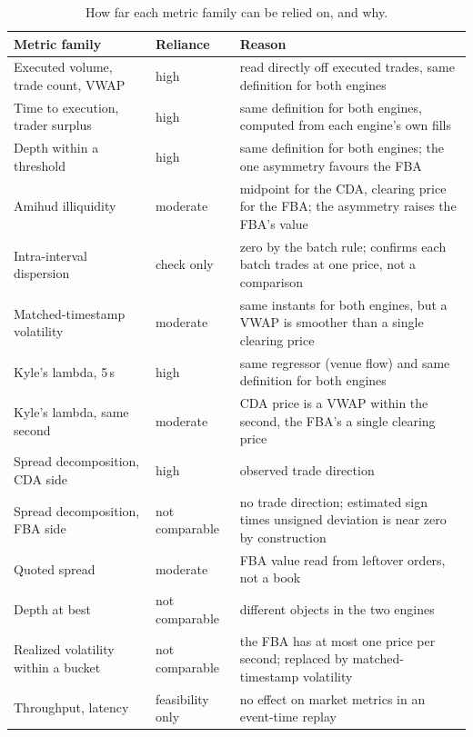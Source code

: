 \begin{table}[htbp]
\centering
\caption[How far each metric can be relied on]{How far each metric family
can be relied on, and why.}
\label{tab:confidence}
\small
\begin{tabularx}{\textwidth}{@{}p{4.2cm} p{2.4cm} L@{}}
\toprule
\textbf{Metric family} & \textbf{Reliance} & \textbf{Reason}\\
\midrule
Executed volume, trade count, VWAP & high & read directly off executed trades, same definition for both engines\\
Time to execution, trader surplus & high & same definition for both engines, computed from each engine's own fills\\
Depth within a threshold & high & same definition for both engines; the one asymmetry favours the FBA\\
Amihud illiquidity & moderate & midpoint for the CDA, clearing price for the FBA; the asymmetry raises the FBA's value\\
Intra-interval dispersion & check only & zero by the batch rule; confirms each batch trades at one price, not a comparison\\
Matched-timestamp volatility & moderate & same instants for both engines, but a VWAP is smoother than a single clearing price\\
Kyle's lambda, 5\,s & high & same regressor (venue flow) and same definition for both engines\\
Kyle's lambda, same second & moderate & CDA price is a VWAP within the second, the FBA's a single clearing price\\
Spread decomposition, CDA side & high & observed trade direction\\
Spread decomposition, FBA side & not comparable & no trade direction; estimated sign times unsigned deviation is near zero by construction\\
Quoted spread & moderate & FBA value read from leftover orders, not a book\\
Depth at best & not comparable & different objects in the two engines\\
Realized volatility within a bucket & not comparable & the FBA has at most one price per second; replaced by matched-timestamp volatility\\
Throughput, latency & feasibility only & no effect on market metrics in an event-time replay\\
\bottomrule
\end{tabularx}
\end{table}
